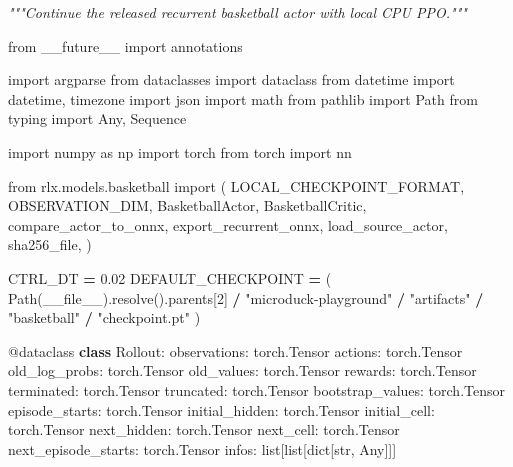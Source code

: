 \documentclass[
  american,
  11pt,
  letterpaper,
]{article}
\newenvironment{Shaded}{\begin{snugshade}}{\end{snugshade}}
\newcommand{\AttributeTok}[1]{\textcolor[rgb]{0.13,0.29,0.53}{#1}}
\newcommand{\BuiltInTok}[1]{#1}
\newcommand{\CommentTok}[1]{\textcolor[rgb]{0.56,0.35,0.01}{\textit{#1}}}
\newcommand{\DecValTok}[1]{\textcolor[rgb]{0.00,0.00,0.81}{#1}}
\newcommand{\FloatTok}[1]{\textcolor[rgb]{0.00,0.00,0.81}{#1}}
\newcommand{\ImportTok}[1]{#1}
\newcommand{\KeywordTok}[1]{\textcolor[rgb]{0.13,0.29,0.53}{\textbf{#1}}}
\newcommand{\NormalTok}[1]{#1}
\newcommand{\OperatorTok}[1]{\textcolor[rgb]{0.81,0.36,0.00}{\textbf{#1}}}
\newcommand{\StringTok}[1]{\textcolor[rgb]{0.31,0.60,0.02}{#1}}
\newcommand{\VariableTok}[1]{\textcolor[rgb]{0.00,0.00,0.00}{#1}}
\renewenvironment{Shaded}{\par\smallskip}{\par\smallskip}
\begin{document}
\begin{Shaded}
\begin{Highlighting}[]
\CommentTok{"""Continue the released recurrent basketball actor with local CPU PPO."""}

\ImportTok{from}\NormalTok{ \_\_future\_\_ }\ImportTok{import}\NormalTok{ annotations}

\ImportTok{import}\NormalTok{ argparse}
\ImportTok{from}\NormalTok{ dataclasses }\ImportTok{import}\NormalTok{ dataclass}
\ImportTok{from}\NormalTok{ datetime }\ImportTok{import}\NormalTok{ datetime, timezone}
\ImportTok{import}\NormalTok{ json}
\ImportTok{import}\NormalTok{ math}
\ImportTok{from}\NormalTok{ pathlib }\ImportTok{import}\NormalTok{ Path}
\ImportTok{from}\NormalTok{ typing }\ImportTok{import}\NormalTok{ Any, Sequence}

\ImportTok{import}\NormalTok{ numpy }\ImportTok{as}\NormalTok{ np}
\ImportTok{import}\NormalTok{ torch}
\ImportTok{from}\NormalTok{ torch }\ImportTok{import}\NormalTok{ nn}

\ImportTok{from}\NormalTok{ rlx.models.basketball }\ImportTok{import}\NormalTok{ (}
\NormalTok{    LOCAL\_CHECKPOINT\_FORMAT,}
\NormalTok{    OBSERVATION\_DIM,}
\NormalTok{    BasketballActor,}
\NormalTok{    BasketballCritic,}
\NormalTok{    compare\_actor\_to\_onnx,}
\NormalTok{    export\_recurrent\_onnx,}
\NormalTok{    load\_source\_actor,}
\NormalTok{    sha256\_file,}
\NormalTok{)}

\NormalTok{CTRL\_DT }\OperatorTok{=} \FloatTok{0.02}
\NormalTok{DEFAULT\_CHECKPOINT }\OperatorTok{=}\NormalTok{ (}
\NormalTok{    Path(}\VariableTok{\_\_file\_\_}\NormalTok{).resolve().parents[}\DecValTok{2}\NormalTok{]}
    \OperatorTok{/} \StringTok{"microduck{-}playground"}
    \OperatorTok{/} \StringTok{"artifacts"}
    \OperatorTok{/} \StringTok{"basketball"}
    \OperatorTok{/} \StringTok{"checkpoint.pt"}
\NormalTok{)}


\AttributeTok{@dataclass}
\KeywordTok{class}\NormalTok{ Rollout:}
\NormalTok{    observations: torch.Tensor}
\NormalTok{    actions: torch.Tensor}
\NormalTok{    old\_log\_probs: torch.Tensor}
\NormalTok{    old\_values: torch.Tensor}
\NormalTok{    rewards: torch.Tensor}
\NormalTok{    terminated: torch.Tensor}
\NormalTok{    truncated: torch.Tensor}
\NormalTok{    bootstrap\_values: torch.Tensor}
\NormalTok{    episode\_starts: torch.Tensor}
\NormalTok{    initial\_hidden: torch.Tensor}
\NormalTok{    initial\_cell: torch.Tensor}
\NormalTok{    next\_hidden: torch.Tensor}
\NormalTok{    next\_cell: torch.Tensor}
\NormalTok{    next\_episode\_starts: torch.Tensor}
\NormalTok{    infos: }\BuiltInTok{list}\NormalTok{[}\BuiltInTok{list}\NormalTok{[}\BuiltInTok{dict}\NormalTok{[}\BuiltInTok{str}\NormalTok{, Any]]]}



\end{Highlighting}
\end{Shaded}
\end{document}
